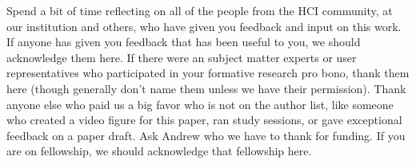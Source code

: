 Spend a bit of time reflecting on all of the people from the HCI community, at our institution and others, who have given you feedback and input on this work. If anyone has given you feedback that has been useful to you, we should acknowledge them here. If there were an subject matter experts or user representatives who participated in your formative research pro bono, thank them here (though generally don't name them unless we have their permission). Thank anyone else who paid us a big favor who is not on the author list, like someone who created a video figure for this paper, ran study sessions, or gave exceptional feedback on a paper draft. Ask Andrew who we have to thank for funding. If you are on fellowship, we should acknowledge that fellowship here.